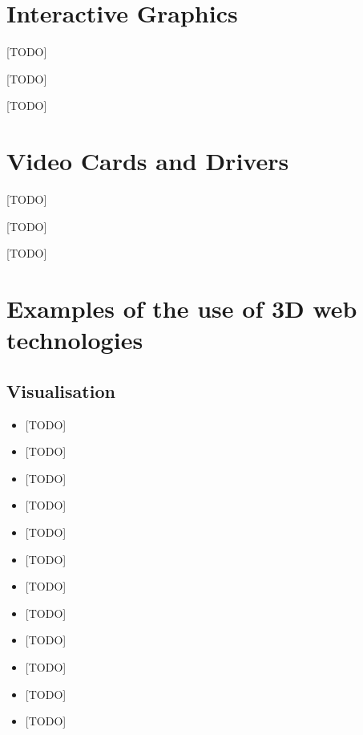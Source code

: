 \documentclass[a4paper,12pt,oneside]{sphinxmanual}
\begin{document}
\index{{[}TODO{]}}

\section{Interactive Graphics}
\label{about:about-interactive-graphics}\label{about:id12}\label{about:index-9}
{[}TODO{]}

{[}TODO{]}

{[}TODO{]}

\index{{[}TODO{]}}\index{{[}TODO{]}}

\section{Video Cards and Drivers}
\label{about:id13}\label{about:about-drivers-video-cards}\label{about:index-10}
{[}TODO{]}

{[}TODO{]}

{[}TODO{]}

\index{{[}TODO{]}!{[}TODO{]}}

\section{Examples of the use of 3D web technologies}
\label{about:index-11}\label{about:id14}\label{about:web3d-examples}

\subsection{Visualisation}
\label{about:id15}\begin{itemize}
\item {} 
{[}TODO{]}

\item {} 
{[}TODO{]}

\item {} 
{[}TODO{]}

\item {} 
{[}TODO{]}

\item {} 
{[}TODO{]}

\item {} 
{[}TODO{]}

\item {} 
{[}TODO{]}

\item {} 
{[}TODO{]}

\item {} 
{[}TODO{]}

\item {} 
{[}TODO{]}

\item {} 
{[}TODO{]}

\item {} 
{[}TODO{]}

\end{itemize}
\end{document}
